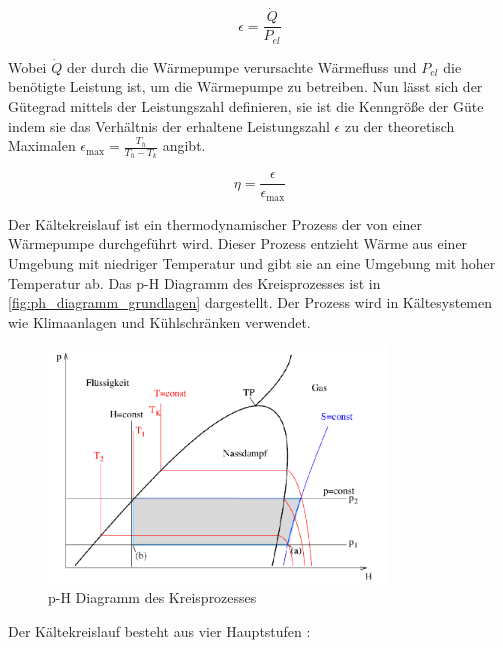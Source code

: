 \documentclass[12pt,english,ngerman]{scrartcl}
\begin{document}
\begin{equation}
	\epsilon = \frac{\dot{Q}}{P_{el}}
	\label{eq:Leistungszahl}
\end{equation}

Wobei $\dot{Q}$ der durch die Wärmepumpe verursachte Wärmefluss und $P_{el}$
die benötigte Leistung ist, um die Wärmepumpe zu betreiben. Nun lässt sich der
Gütegrad mittels der Leistungszahl definieren, sie ist die Kenngröße der Güte
indem sie das Verhältnis der erhaltene Leistungszahl $\epsilon$ zu der
theoretisch Maximalen $\epsilon_\text{max} = \frac{T_h}{T_h-T_k}$ angibt.

\begin{equation}
	\eta = \frac{\epsilon}{\epsilon_\text{max}}
	\label{eq:guetefaktor}
\end{equation}

Der Kältekreislauf ist ein thermodynamischer Prozess der von einer Wärmepumpe
durchgeführt wird. Dieser Prozess entzieht Wärme aus einer Umgebung mit
niedriger Temperatur und gibt sie an eine Umgebung mit hoher Temperatur ab. Das
p-H Diagramm des Kreisprozesses ist in \autoref{fig:ph_diagramm_grundlagen}
dargestellt. Der Prozess wird in Kältesystemen wie Klimaanlagen und
Kühlschränken verwendet.

\begin{figure}[H]
	\begin{center}
		\includegraphics[width =0.8\textwidth]{./figures/ph_diagramm_grundlagen.PNG}
	\end{center}
	\caption[p-H Diagramm des Kreisprozesses]{p-H Diagramm des Kreisprozesses
		\cite{hohenau_warmepumpe_2014}
	}\label{fig:ph_diagramm_grundlagen}
\end{figure}

Der Kältekreislauf besteht aus vier Hauptstufen \cite{hohenau_warmepumpe_2014}:
\end{document}
